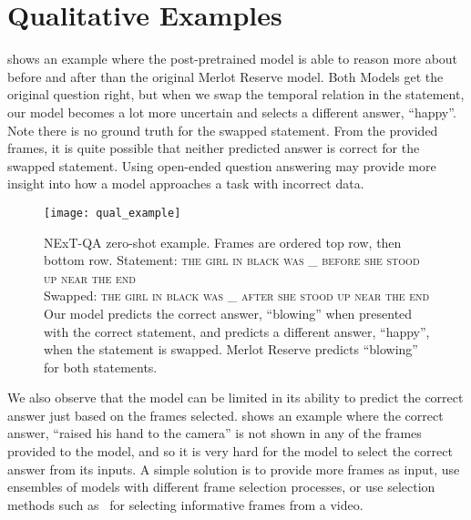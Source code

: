 \section{Qualitative Examples}
\label{sec:qualresults}


 shows an example where the post-pretrained model is
able to reason more about before and after than the original Merlot Reserve
model. Both Models get the original question right, but when we swap the
temporal relation in the statement, our model becomes a lot more uncertain and
selects a different answer, ``happy''. Note there is no ground truth for the
swapped statement. From the provided frames, it is quite possible that neither
predicted answer is correct for the swapped statement. Using open-ended
question answering may provide more insight into how a model approaches a task
with incorrect data.

\begin{figure}[t]
	\centering
	\texttt{[image: qual\_example]}
	\caption{NExT-QA zero-shot example. Frames are ordered top row, then bottom row.
		Statement: \textsc{the girl in black was \_ before she stood up near the end}\\
		Swapped: \textsc{the girl in black was \_ after she stood up near the end}\\
		Our model predicts the correct answer,
		``blowing''  when presented with the correct statement, and predicts a
		different answer, ``happy'',  when the statement is swapped. Merlot
	Reserve predicts ``blowing'' for both statements.}
	\label{fig:qual_example}
\end{figure}

We also observe that the model can be limited in its ability to predict the
correct answer just based on the frames selected.  shows
an example where the correct answer, ``raised his hand to the camera'' is not
shown in any of the frames provided to the model, and so it is very hard for
the model to select the correct answer from its inputs. A simple solution is to
provide more frames as input, use ensembles of models with different frame
selection processes, or use selection methods such
as~\citet{buch2022revisiting, lei2023revealing} for selecting informative
frames from a video.

